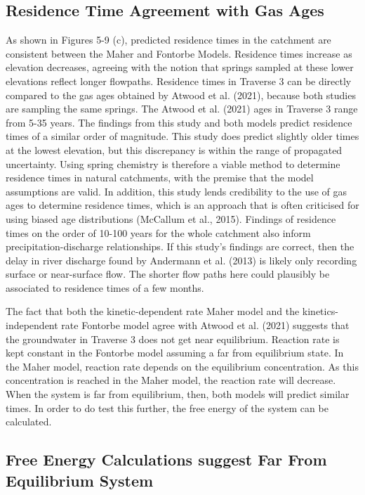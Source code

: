 \subsection{Residence Time Agreement with Gas Ages}

As shown in Figures 5-9 (c), predicted residence times in the catchment are consistent between the Maher and Fontorbe Models. Residence times increase as elevation decreases, agreeing with the notion that springs sampled at these lower elevations reflect longer flowpaths. Residence times in Traverse 3 can be directly compared to the gas ages obtained by Atwood et al. (2021), because both studies are sampling the same springs. The Atwood et al. (2021) ages in Traverse 3 range from 5-35 years. The findings from this study and both models predict residence times of a similar order of magnitude. This study does predict slightly older times at the lowest elevation, but this discrepancy is within the range of propagated uncertainty. Using spring chemistry is therefore a viable method to determine residence times in natural catchments, with the premise that the model assumptions are valid. In addition, this study lends credibility to the use of gas ages to determine residence times, which is an approach that is often criticised for using biased age distributions (McCallum et al., 2015). Findings of residence times on the order of 10-100 years for the whole catchment also inform precipitation-discharge relationships. If this study's findings are correct, then the delay in river discharge found by Andermann et al. (2013) is likely only recording surface or near-surface flow. The shorter flow paths here could plausibly be associated to residence times of a few months.

\bsk

The fact that both the kinetic-dependent rate Maher model and the kinetics-independent rate Fontorbe model agree with Atwood et al. (2021) suggests that the groundwater in Traverse 3 does not get near equilibrium. Reaction rate is kept constant in the Fontorbe model assuming a far from equilibrium state. In the Maher model, reaction rate depends on the equilibrium concentration. As this concentration is reached in the Maher model, the reaction rate will decrease. When the system is far from equilibrium, then, both models will predict similar times. In order to do test this further, the free energy of the system can be calculated.


\newpage

\subsection{Free Energy Calculations suggest Far From Equilibrium System}


